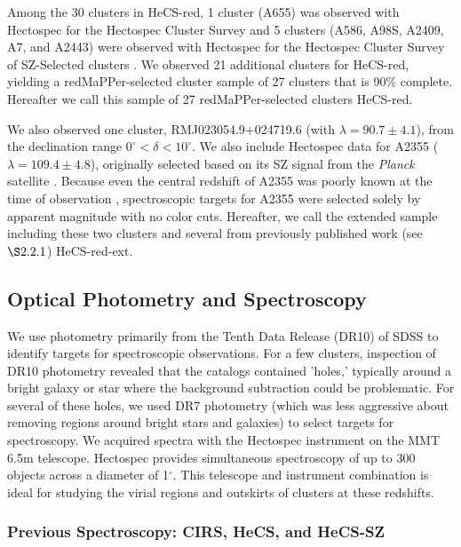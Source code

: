 Among the 30 clusters in HeCS-red, 1 cluster (A655) 
was observed with Hectospec for the Hectospec Cluster Survey \citep[HeCS;][]{hecsultimate} 
and 5 clusters (A586, A98S, A2409, A7, and A2443) were observed with 
Hectospec for  the Hectospec Cluster Survey of SZ-Selected clusters \citep[HeCS-SZ;][]{hecsplanck}. 
We observed 21 additional clusters for HeCS-red, yielding a redMaPPer-selected 
cluster sample of 27 clusters that is 90\% complete. 
Hereafter we call this sample of 27 redMaPPer-selected clusters HeCS-red.


We also observed one cluster, RMJ023054.9+024719.6
(with $\lambda=90.7\pm4.1$), 
from the declination range $0^\circ <\delta <10^\circ$.
We also include Hectospec data for A2355 ($\lambda=109.4\pm4.8$), %
originally selected based 
on its SZ signal from the {\em Planck} satellite \citep{planckszcatalog}.
Because even the central redshift of A2355 was poorly known at the time of 
observation \citep[e.g.,][lists a redshift of $z=0.1244$]{reflex}, spectroscopic targets for A2355
were selected solely by apparent magnitude with no color cuts. 
Hereafter, we call the extended sample including these two clusters and several 
from previously published work (see $\S 2.2.1$) HeCS-red-ext.


\subsection{Optical Photometry and Spectroscopy}

We use photometry primarily from the Tenth Data Release 
(DR10) of SDSS \citep{sdssdr10} 
to identify targets for spectroscopic observations.    
For a few clusters, inspection of DR10 photometry revealed that the catalogs 
contained 'holes,' typically around a bright galaxy or star where the background 
subtraction could be problematic.  For several of these holes, we used DR7 
photometry (which was less aggressive about removing regions around bright 
stars and galaxies) to select targets for spectroscopy. 
We acquired spectra with the
Hectospec instrument \citep{hectospec} on the MMT 6.5m telescope.
Hectospec provides simultaneous spectroscopy of up to 300 objects
across a diameter of 1$^\circ$.  This telescope and instrument
combination is ideal for studying the virial regions and outskirts of
clusters at these redshifts. 


\subsubsection{Previous Spectroscopy: CIRS, HeCS, and HeCS-SZ}

